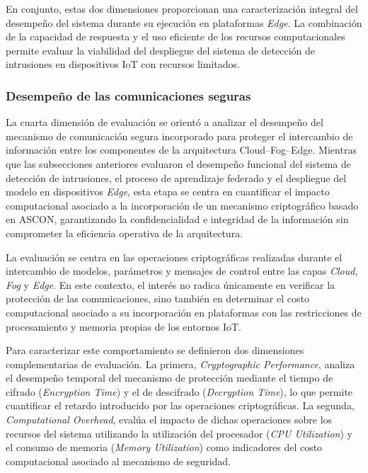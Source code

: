 \documentclass[journal,article,submit,moreauthors]{Definitions/mdpi}
\begin{document}
En conjunto, estas dos dimensiones proporcionan una caracterización integral del desempeño del sistema durante su ejecución en plataformas \textit{Edge}. La combinación de la capacidad de respuesta y el uso eficiente de los recursos computacionales permite evaluar la viabilidad del despliegue del sistema de detección de intrusiones en dispositivos IoT con recursos limitados.

\subsubsection{Desempeño de las comunicaciones seguras}
La cuarta dimensión de evaluación se orientó a analizar el desempeño del mecanismo de comunicación segura incorporado para proteger el intercambio de información entre los componentes de la arquitectura Cloud--Fog--Edge. Mientras que las subsecciones anteriores evaluaron el desempeño funcional del sistema de detección de intrusiones, el proceso de aprendizaje federado y el despliegue del modelo en dispositivos \textit{Edge}, esta etapa se centra en cuantificar el impacto computacional asociado a la incorporación de un mecanismo criptográfico basado en ASCON, garantizando la confidencialidad e integridad de la información sin comprometer la eficiencia operativa de la arquitectura.

La evaluación se centra en las operaciones criptográficas realizadas durante el intercambio de modelos, parámetros y mensajes de control entre las capas \textit{Cloud}, \textit{Fog} y \textit{Edge}. En este contexto, el interés no radica únicamente en verificar la protección de las comunicaciones, sino también en determinar el costo computacional asociado a su incorporación en plataformas con las restricciones de procesamiento y memoria propias de los entornos IoT.

Para caracterizar este comportamiento se definieron dos dimensiones complementarias de evaluación. La primera, \textit{Cryptographic Performance}, analiza el desempeño temporal del mecanismo de protección mediante el tiempo de cifrado (\textit{Encryption Time}) y el de descifrado (\textit{Decryption Time}), lo que permite cuantificar el retardo introducido por las operaciones criptográficas. La segunda, \textit{Computational Overhead}, evalúa el impacto de dichas operaciones sobre los recursos del sistema utilizando la utilización del procesador (\textit{CPU Utilization}) y el consumo de memoria (\textit{Memory Utilization}) como indicadores del costo computacional asociado al mecanismo de seguridad.
\end{document}
